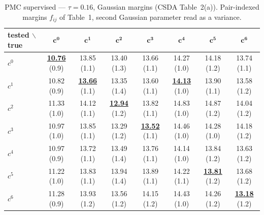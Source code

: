 \begin{table}[htbp]
  \centering
  \small
  \setlength{\tabcolsep}{4pt}
  \caption{PMC supervised — $\tau = 0.16$, Gaussian margins (CSDA Table~2(a)). Pair-indexed margins $f_{ij}$ of Table~1, second Gaussian parameter read as a variance.}
  \label{tab:exp1-low_tau_gauss}
  \begin{tabular}{lccccccc}
    \toprule
    tested $\backslash$ true & $\mathbf{c^{0}}$ & $\mathbf{c^{1}}$ & $\mathbf{c^{2}}$ & $\mathbf{c^{3}}$ & $\mathbf{c^{4}}$ & $\mathbf{c^{5}}$ & $\mathbf{c^{6}}$ \\
    \midrule
    $c^{0}$ & \textbf{\underline{10.76}} (0.9) & 13.85 (1.1) & 13.40 (1.3) & 13.66 (1.1) & 14.27 (1.0) & 14.18 (1.2) & 13.74 (1.1) \\
    $c^{1}$ & 10.82 (0.9) & \textbf{\underline{13.66}} (1.1) & 13.35 (1.4) & 13.60 (1.1) & \textbf{\underline{14.13}} (1.0) & 13.90 (1.1) & 13.58 (1.2) \\
    $c^{2}$ & 11.33 (1.0) & 14.12 (1.1) & \textbf{\underline{12.94}} (1.2) & 13.82 (1.1) & 14.83 (1.0) & 14.87 (1.2) & 14.04 (1.2) \\
    $c^{3}$ & 10.97 (1.0) & 13.85 (1.1) & 13.29 (1.2) & \textbf{\underline{13.52}} (1.1) & 14.46 (1.0) & 14.28 (1.0) & 14.18 (1.2) \\
    $c^{4}$ & 10.97 (0.9) & 13.72 (1.1) & 13.49 (1.4) & 13.76 (1.1) & 14.14 (1.0) & 13.84 (1.2) & 13.63 (1.2) \\
    $c^{5}$ & 11.22 (1.0) & 13.83 (1.1) & 13.94 (1.4) & 13.89 (1.1) & 14.22 (1.1) & \textbf{\underline{13.81}} (1.2) & 13.68 (1.2) \\
    $c^{6}$ & 11.28 (0.9) & 13.93 (1.2) & 13.56 (1.2) & 14.15 (1.2) & 14.43 (1.0) & 14.26 (1.2) & \textbf{\underline{13.18}} (1.2) \\
    \bottomrule
  \end{tabular}
\end{table}
